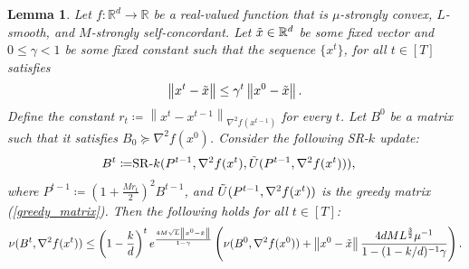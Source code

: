 \documentclass[letterpaper]{article} %
\theoremstyle{plain}
\newtheorem{lemma}[theorem]{Lemma}
\theoremstyle{definition}
\theoremstyle{remark}
\newcommand\norm[1]{\left\lVert#1\right\rVert}
\def\BR{{\mathbb{R}}}
\begin{document}
\begin{lemma}
    Let $f: \BR^d \to \BR$ be a real-valued function that is $\mu$-strongly convex, $L$-smooth, and $M$-strongly self-concordant. Let $\Tilde{x} \in \BR^d$ be some fixed vector and $0 \leq \gamma < 1$ be some fixed constant such that the sequence $\{ x^t \}$, for all $t \in [T]$ satisfies
    \begin{equation}
        \norm{x^t - \Tilde{x}} \leq \gamma^t \norm{x^0 - \Tilde{x}}.
        \label{eq:dist_hypo_1}
    \end{equation}
    Define the constant $r_t \coloneqq \norm{x^t - x^{t-1}}_{\nabla^2 f(x^{t-1})}$ for every $t$. Let $B^0$ be a matrix such that it satisfies $B_0 \succeq \nabla^2 f(x^0)$. Consider the following SR-$k$ update:
    \begin{align*}  
        B^t \coloneqq & \mathrm{SR}\textrm{-}k(P^{t-1}, \nabla^2 f(x^t), \Tilde{U}(P^{t-1}, \nabla^2 f(x^t))),
    \end{align*}
    where $P^{t-1} \coloneqq (1 + \frac{M r_t}{2})^2 B^{t-1}$, %
    and $\Tilde{U}(P^{t-1}, \nabla^2 f(x^t))$ is the greedy matrix (\ref{greedy_matrix}). Then the following holds for all $t \in [T]$:
    \begin{equation}
        \nu(B^t, \nabla^2 f(x^t)) \leq  \left(1 - \frac{k}{d}\right)^t e^ {\frac{4 M \sqrt{L}  \norm{x^0 - \Tilde{x}}}{1 - \gamma} } \left( \nu (B^{0}, \nabla^2 f(x^{0})) + \norm{x^0 - \Tilde{x}} \frac{4 d M L^{\frac{3}{2}} \mu^{-1} }{1 - (1 - k / d)^{-1} \gamma}  \right) .
    \end{equation}
    \label{lemma:srk_recur}
\end{lemma}
\end{document}
